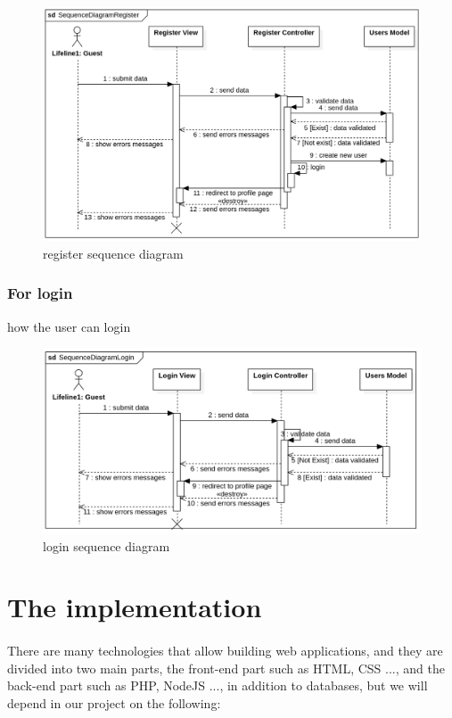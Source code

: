 \documentclass[12pt,a4paper]{article}
\begin{document}
			\begin{figure}[!h]
				\centering
				\includegraphics[width=\textwidth]{diagrams/register_sequence.png}
				\caption{register sequence diagram}
				\label{fig:register-s-d}
			\end{figure}
		
		\subsubsection{For login}
		how the user can login
		
			\begin{figure}[!h]
				\centering
				\includegraphics[width=\textwidth]{diagrams/login_sequence.png}
				\caption{login sequence diagram}
				\label{fig:login-s-d}
			\end{figure}
	
	\clearpage
	\section{The implementation}
	\paragraph{}
	There are many technologies that allow building web applications, and they are divided into two main parts, the front-end part such as HTML, CSS ..., and the back-end part such as PHP, NodeJS ..., in addition to databases, but we will depend in our project on the following:
\end{document}
